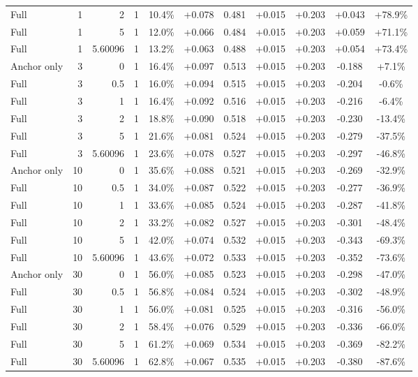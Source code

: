 \begin{table}[htbp]
\begin{tabular}{lrrrccccccc}
Full & 1 & 2 & 1 & 10.4\% & +0.078 & 0.481 & +0.015 & +0.203 & +0.043 & +78.9\% \\
Full & 1 & 5 & 1 & 12.0\% & +0.066 & 0.484 & +0.015 & +0.203 & +0.059 & +71.1\% \\
Full & 1 & 5.60096 & 1 & 13.2\% & +0.063 & 0.488 & +0.015 & +0.203 & +0.054 & +73.4\% \\
Anchor only & 3 & 0 & 1 & 16.4\% & +0.097 & 0.513 & +0.015 & +0.203 & -0.188 & +7.1\% \\
Full & 3 & 0.5 & 1 & 16.0\% & +0.094 & 0.515 & +0.015 & +0.203 & -0.204 & -0.6\% \\
Full & 3 & 1 & 1 & 16.4\% & +0.092 & 0.516 & +0.015 & +0.203 & -0.216 & -6.4\% \\
Full & 3 & 2 & 1 & 18.8\% & +0.090 & 0.518 & +0.015 & +0.203 & -0.230 & -13.4\% \\
Full & 3 & 5 & 1 & 21.6\% & +0.081 & 0.524 & +0.015 & +0.203 & -0.279 & -37.5\% \\
Full & 3 & 5.60096 & 1 & 23.6\% & +0.078 & 0.527 & +0.015 & +0.203 & -0.297 & -46.8\% \\
Anchor only & 10 & 0 & 1 & 35.6\% & +0.088 & 0.521 & +0.015 & +0.203 & -0.269 & -32.9\% \\
Full & 10 & 0.5 & 1 & 34.0\% & +0.087 & 0.522 & +0.015 & +0.203 & -0.277 & -36.9\% \\
Full & 10 & 1 & 1 & 33.6\% & +0.085 & 0.524 & +0.015 & +0.203 & -0.287 & -41.8\% \\
Full & 10 & 2 & 1 & 33.2\% & +0.082 & 0.527 & +0.015 & +0.203 & -0.301 & -48.4\% \\
Full & 10 & 5 & 1 & 42.0\% & +0.074 & 0.532 & +0.015 & +0.203 & -0.343 & -69.3\% \\
Full & 10 & 5.60096 & 1 & 43.6\% & +0.072 & 0.533 & +0.015 & +0.203 & -0.352 & -73.6\% \\
Anchor only & 30 & 0 & 1 & 56.0\% & +0.085 & 0.523 & +0.015 & +0.203 & -0.298 & -47.0\% \\
Full & 30 & 0.5 & 1 & 56.8\% & +0.084 & 0.524 & +0.015 & +0.203 & -0.302 & -48.9\% \\
Full & 30 & 1 & 1 & 56.0\% & +0.081 & 0.525 & +0.015 & +0.203 & -0.316 & -56.0\% \\
Full & 30 & 2 & 1 & 58.4\% & +0.076 & 0.529 & +0.015 & +0.203 & -0.336 & -66.0\% \\
Full & 30 & 5 & 1 & 61.2\% & +0.069 & 0.534 & +0.015 & +0.203 & -0.369 & -82.2\% \\
Full & 30 & 5.60096 & 1 & 62.8\% & +0.067 & 0.535 & +0.015 & +0.203 & -0.380 & -87.6\% \\

\end{tabular}
\end{table}
